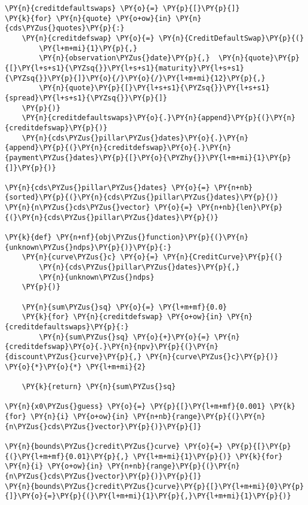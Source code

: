 \begin{Answer}
\begin{tcolorbox}[size=fbox, boxrule=1pt, pad at break*=1mm,colback=cellbackground, colframe=cellborder]
\begin{Verbatim}[commandchars=\\\{\}]
\PY{n}{creditdefaultswaps} \PY{o}{=} \PY{p}{[}\PY{p}{]}
\PY{k}{for} \PY{n}{quote} \PY{o+ow}{in} \PY{n}{cds\PYZus{}quotes}\PY{p}{:}
    \PY{n}{creditdefswap} \PY{o}{=} \PY{n}{CreditDefaultSwap}\PY{p}{(}
        \PY{l+m+mi}{1}\PY{p}{,}            
        \PY{n}{observation\PYZus{}date}\PY{p}{,}  \PY{n}{quote}\PY{p}{[}\PY{l+s+s1}{\PYZsq{}}\PY{l+s+s1}{maturity}\PY{l+s+s1}{\PYZsq{}}\PY{p}{]}\PY{o}{/}\PY{o}{/}\PY{l+m+mi}{12}\PY{p}{,}
        \PY{n}{quote}\PY{p}{[}\PY{l+s+s1}{\PYZsq{}}\PY{l+s+s1}{spread}\PY{l+s+s1}{\PYZsq{}}\PY{p}{]}   
    \PY{p}{)}
    \PY{n}{creditdefaultswaps}\PY{o}{.}\PY{n}{append}\PY{p}{(}\PY{n}{creditdefswap}\PY{p}{)}
    \PY{n}{cds\PYZus{}pillar\PYZus{}dates}\PY{o}{.}\PY{n}{append}\PY{p}{(}\PY{n}{creditdefswap}\PY{o}{.}\PY{n}{payment\PYZus{}dates}\PY{p}{[}\PY{o}{\PYZhy{}}\PY{l+m+mi}{1}\PY{p}{]}\PY{p}{)}
    
\PY{n}{cds\PYZus{}pillar\PYZus{}dates} \PY{o}{=} \PY{n+nb}{sorted}\PY{p}{(}\PY{n}{cds\PYZus{}pillar\PYZus{}dates}\PY{p}{)}
\PY{n}{n\PYZus{}cds\PYZus{}vector} \PY{o}{=} \PY{n+nb}{len}\PY{p}{(}\PY{n}{cds\PYZus{}pillar\PYZus{}dates}\PY{p}{)}

\PY{k}{def} \PY{n+nf}{obj\PYZus{}function}\PY{p}{(}\PY{n}{unknown\PYZus{}ndps}\PY{p}{)}\PY{p}{:}
    \PY{n}{curve\PYZus{}c} \PY{o}{=} \PY{n}{CreditCurve}\PY{p}{(}
        \PY{n}{cds\PYZus{}pillar\PYZus{}dates}\PY{p}{,}
        \PY{n}{unknown\PYZus{}ndps}
    \PY{p}{)}

    \PY{n}{sum\PYZus{}sq} \PY{o}{=} \PY{l+m+mf}{0.0}
    \PY{k}{for} \PY{n}{creditdefswap} \PY{o+ow}{in} \PY{n}{creditdefaultswaps}\PY{p}{:}
        \PY{n}{sum\PYZus{}sq} \PY{o}{+}\PY{o}{=} \PY{n}{creditdefswap}\PY{o}{.}\PY{n}{npv}\PY{p}{(}\PY{n}{discount\PYZus{}curve}\PY{p}{,} \PY{n}{curve\PYZus{}c}\PY{p}{)} \PY{o}{*}\PY{o}{*} \PY{l+m+mi}{2}

    \PY{k}{return} \PY{n}{sum\PYZus{}sq}

\PY{n}{x0\PYZus{}guess} \PY{o}{=} \PY{p}{[}\PY{l+m+mf}{0.001} \PY{k}{for} \PY{n}{i} \PY{o+ow}{in} \PY{n+nb}{range}\PY{p}{(}\PY{n}{n\PYZus{}cds\PYZus{}vector}\PY{p}{)}\PY{p}{]}

\PY{n}{bounds\PYZus{}credit\PYZus{}curve} \PY{o}{=} \PY{p}{[}\PY{p}{(}\PY{l+m+mf}{0.01}\PY{p}{,} \PY{l+m+mi}{1}\PY{p}{)} \PY{k}{for} \PY{n}{i} \PY{o+ow}{in} \PY{n+nb}{range}\PY{p}{(}\PY{n}{n\PYZus{}cds\PYZus{}vector}\PY{p}{)}\PY{p}{]}
\PY{n}{bounds\PYZus{}credit\PYZus{}curve}\PY{p}{[}\PY{l+m+mi}{0}\PY{p}{]}\PY{o}{=}\PY{p}{(}\PY{l+m+mi}{1}\PY{p}{,}\PY{l+m+mi}{1}\PY{p}{)}
\end{Verbatim}
\end{tcolorbox}


\end{Answer}
